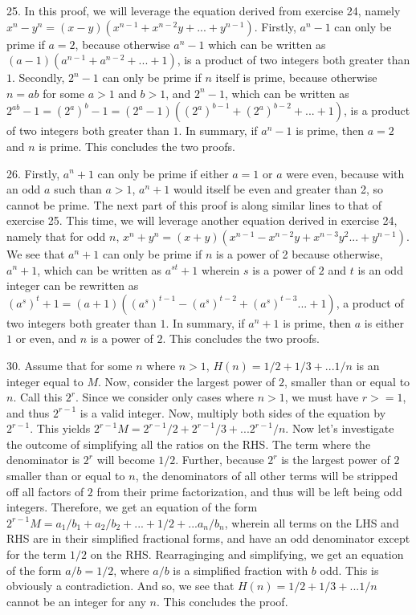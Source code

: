 \documentclass{article}
\begin{document}
25. In this proof, we will leverage the equation derived from exercise 24, namely $x^n - y^n = (x - y)(x^{n - 1} + x^{n - 2}y + ... + y^{n - 1})$. Firstly, $a^n - 1$ can only be prime if $a = 2$, because otherwise $a^n - 1$ which can be written as $(a - 1)(a^{n - 1} + a^{n - 2} + ... + 1)$, is a product of two integers both greater than $1$. Secondly, $2^n - 1$ can only be prime if $n$ itself is prime, because otherwise $n = ab$ for some $a > 1$ and $b > 1$, and $2^n - 1$, which can be written as $2^{ab} - 1 = (2^a)^b - 1 = (2^a - 1)((2^a)^{b - 1} + (2^a)^{b - 2} + ... + 1)$, is a product of two integers both greater than $1$. In summary, if $a^n - 1$ is prime, then $a = 2$ and $n$ is prime. This concludes the two proofs.

26. Firstly, $a^n + 1$ can only be prime if either $a = 1$ or $a$ were even, because with an odd $a$ such than $a > 1$, $a^n + 1$ would itself be even and greater than 2, so cannot be prime. The next part of this proof is along similar lines to that of exercise 25. This time, we will leverage another equation derived in exercise 24, namely that for odd $n$, $x^n + y^n = (x + y)(x^{n - 1} - x^{n - 2}y + x^{n - 3}y^2 ... + y^{n - 1})$. We see that $a^n + 1$ can only be prime if $n$ is a power of 2 because otherwise, $a^n + 1$, which can be written as $a^{st} + 1$ wherein $s$ is a power of $2$ and $t$ is an odd integer can be rewritten as $(a^s)^t + 1 = (a + 1)((a^s)^{t - 1} - (a^s)^{t - 2} + (a^s)^{t - 3} ... + 1)$, a product of two integers both greater than $1$. In summary, if $a^n + 1$ is prime, then $a$ is either $1$ or even, and $n$ is a power of $2$. This concludes the two proofs.

30. Assume that for some $n$ where $n > 1$, $H(n) = 1 / 2 + 1 / 3 + ... 1 / n$ is an integer equal to $M$. Now, consider the largest power of $2$, smaller than or equal to $n$. Call this $2^r$. Since we consider only cases where $n > 1$, we must have $r >= 1$, and thus $2^{r - 1}$ is a valid integer. Now, multiply both sides of the equation by $2^{r - 1}$. This yields $2^{r - 1}M = 2^{r - 1} / 2 + 2^{r - 1} / 3 + ... 2^{r - 1} / n$. Now let's investigate the outcome of simplifying all the ratios on the RHS. The term where the denominator is $2^r$ will become $1 / 2$. Further, because $2^r$ is the largest power of $2$ smaller than or equal to $n$, the denominators of all other terms will be stripped off all factors of $2$ from their prime factorization, and thus will be left being odd integers. Therefore, we get an equation of the form $2^{r - 1}M = a_1 / b_1 + a_2 / b_2 + ... + 1 / 2 + ... a_n / b_n$, wherein all terms on the LHS and RHS are in their simplified fractional forms, and have an odd denominator except for the term $1 / 2$ on the RHS. Rearraginging and simplifying, we get an equation of the form $a / b = 1 / 2$, where $a / b$ is a simplified fraction with $b$ odd. This is obviously a contradiction. And so, we see that $H(n) = 1 / 2 + 1 / 3 + ... 1 / n$ cannot be an integer for any $n$. This concludes the proof.
\end{document}
